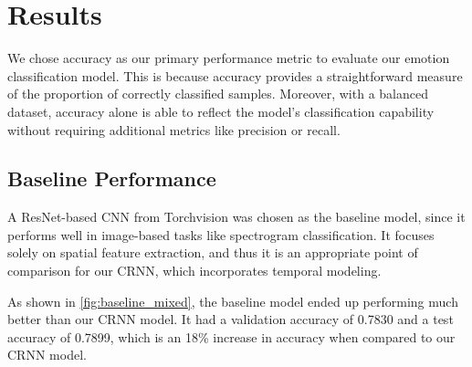 \documentclass[../main.tex]{subfiles}
\begin{document}
\section{Results}
We chose accuracy as our primary performance metric to evaluate our emotion 
classification model. This is because accuracy provides a straightforward 
measure of the proportion of correctly classified samples. Moreover, with a 
balanced dataset, accuracy alone is able to reflect the model's 
classification capability without requiring additional metrics like precision 
or recall.

\subsection{Baseline Performance}

A ResNet-based CNN from Torchvision was chosen as the baseline model, since it performs well in image-based tasks like spectrogram 
classification. It focuses solely on spatial feature 
extraction, and thus it is an appropriate point of comparison for our CRNN, 
which incorporates temporal modeling.

As shown in \autoref{fig:baseline_mixed}, the baseline model ended up performing much 
better than our CRNN model. It had a validation accuracy of 0.7830 and a 
test accuracy of 0.7899, which is an 18\% increase in accuracy when compared to 
our CRNN model.
\end{document}
